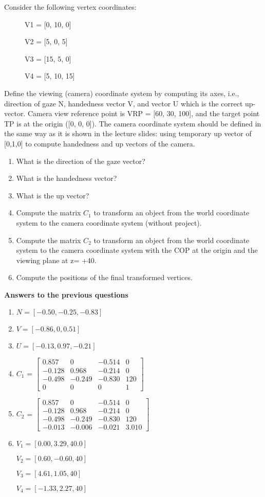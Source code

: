 Consider the following vertex coordinates:
\begin{figure}[!hbt]
	\centering
	V1 = [0, 10, 0]
	
	V2 = [5, 0, 5]
	
	V3 = [15, 5, 0]
	
	V4 = [5, 10, 15]
\end{figure}

Define the viewing (camera) coordinate system by computing its axes, i.e., direction of gaze N, handedness vector V, and vector U which is the correct up-vector. Camera view reference point is VRP = [60, 30, 100], and the target point TP is at the origin ([0, 0, 0]). The camera coordinate system should be defined in the same way as it is shown in the lecture slides: using temporary up vector of [0,1,0] to compute handedness and up vectors of the camera.
\begin{enumerate}
	\item What is the direction of the gaze vector?
	\item What is the handedness vector?
	\item What is the up vector?
	\item Compute the matrix $C_1$ to transform an object from the world coordinate system to the camera coordinate system (without project).
	\item Compute the matrix $C_2$ to transform an object from the world coordinate system to the camera coordinate system with the COP at the origin and the viewing plane at z= +40.
	\item Compute the positions of the final transformed vertices.
\end{enumerate}
\newpage
\textbf{Answers to the previous questions}
\newline
\begin{enumerate}
	\item $N = [-0.50, -0.25, -0.83]$
	\item $V = [-0.86, 0, 0.51]$
	\item $U = [-0.13, 0.97, -0.21]$
	\item $C_1$ = $\begin{bmatrix}
		0.857 & 0 & -0.514 & 0\\ 
		-0.128 & 0.968 & -0.214 & 0\\ 
		-0.498 & -0.249 & -0.830 & 120\\
		0 & 0 & 0 & 1 
	\end{bmatrix}$
		\item $C_2$ = $\begin{bmatrix}
	0.857 & 0 & -0.514 & 0\\ 
	-0.128 & 0.968 & -0.214 & 0\\ 
	-0.498 & -0.249 & -0.830 & 120\\
	-0.013 & -0.006 & -0.021 & 3.010 
	\end{bmatrix}$
	\item $V_1 = [0.00, 3.29, 40.0]$
	
	$V_2 = [0.60, -0.60, 40]$
	
	$V_3 = [4.61, 1.05, 40]$
	
	$V_4 = [-1.33, 2.27, 40]$
\end{enumerate}

